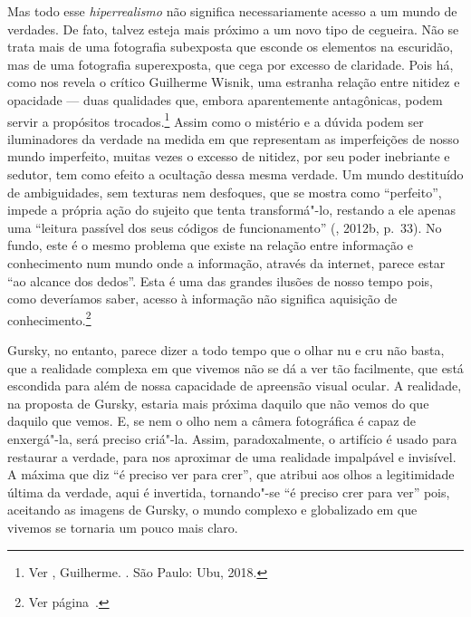 Mas todo esse \emph{hiperrealismo} não significa necessariamente acesso
a um mundo de verdades. De fato, talvez esteja mais próximo a um novo
tipo de cegueira. Não se trata mais de uma fotografia subexposta que
esconde os elementos na escuridão, mas de uma fotografia superexposta,
que cega por excesso de claridade. Pois há, como nos revela o crítico
Guilherme Wisnik, uma estranha relação entre nitidez e opacidade --- duas
qualidades que, embora aparentemente antagônicas, podem servir a
propósitos trocados.\footnote{Ver , Guilherme. {}. São Paulo:
  Ubu, 2018.} Assim como o mistério e a dúvida podem ser iluminadores da
verdade na medida em que representam as imperfeições de nosso mundo
imperfeito, muitas vezes o excesso de nitidez, por seu poder inebriante
e sedutor, tem como efeito a ocultação dessa mesma verdade. Um mundo
destituído de ambiguidades, sem texturas nem desfoques, que se mostra
como ``perfeito'', impede a própria ação do sujeito que tenta
transformá"-lo, restando a ele apenas uma ``leitura passível dos seus
códigos de funcionamento'' (, 2012b, p.~33). No fundo, este é o
mesmo problema que existe na relação entre informação e conhecimento num
mundo onde a informação, através da internet, parece estar ``ao alcance
dos dedos''. Esta é uma das grandes ilusões de nosso tempo pois, como
deveríamos saber, acesso à informação não significa aquisição de
conhecimento.\footnote{Ver página~\pageref{internet}.}

Gursky, no entanto, parece dizer a todo tempo que o olhar nu e cru não
basta, que a realidade complexa em que vivemos não se dá a ver tão
facilmente, que está escondida para além de nossa capacidade de
apreensão visual ocular. A realidade, na proposta de Gursky, estaria
mais próxima daquilo que não vemos do que daquilo que vemos. E, se nem o
olho nem a câmera fotográfica é capaz de enxergá"-la, será preciso
criá"-la. Assim, paradoxalmente, o artifício é usado para restaurar a
verdade, para nos aproximar de uma realidade impalpável e invisível. A
máxima que diz ``é preciso ver para crer'', que atribui aos olhos a
legitimidade última da verdade, aqui é invertida, tornando"-se ``é
preciso crer para ver'' pois, aceitando as imagens de Gursky, o mundo
complexo e globalizado em que vivemos se tornaria um pouco mais claro.

